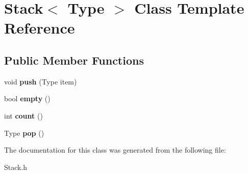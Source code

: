 \hypertarget{class_stack}{}\section{Stack$<$ Type $>$ Class Template Reference}
\label{class_stack}
\subsection*{Public Member Functions}
\begin{DoxyCompactItemize}
\item 
\mbox{\label{class_stack_a12509631738ba84ee426b2a204d4402a}} 
void {\bfseries push} (Type item)
\item 
\mbox{\label{class_stack_ae712de8026eaaad433e4f1e016effabb}} 
bool {\bfseries empty} ()
\item 
\mbox{\label{class_stack_a2a8daadc1f221da7f7ceb87eb504f4f4}} 
int {\bfseries count} ()
\item 
\mbox{\label{class_stack_ae8d94f9cabbf93bf0f940dee67e98b62}} 
Type {\bfseries pop} ()
\end{DoxyCompactItemize}


The documentation for this class was generated from the following file\+:\begin{DoxyCompactItemize}
\item 
Stack.\+h\end{DoxyCompactItemize}
